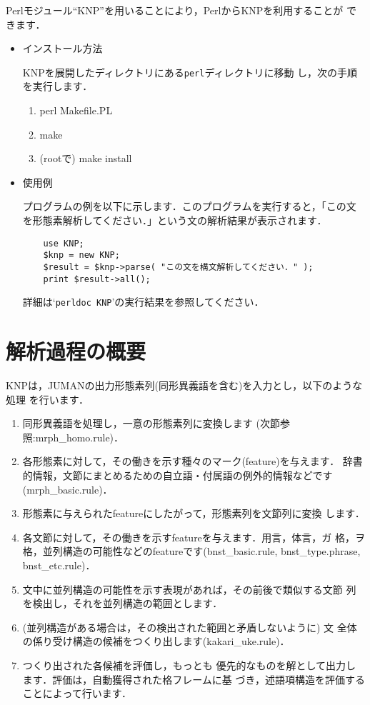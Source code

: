 \documentclass[a4j,11pt,titlepage]{jarticle}
\begin{document}
Perlモジュール``KNP''を用いることにより，PerlからKNPを利用することが
できます．

\begin{itemize}
 \item インストール方法

       KNPを展開したディレクトリにある\texttt{perl}ディレクトリに移動
       し，次の手順を実行します．
       \begin{enumerate}
	\item perl Makefile.PL
	\item make
	\item (rootで) make install
       \end{enumerate}
 \item 使用例

       プログラムの例を以下に示します．このプログラムを実行すると，「この文
       を形態素解析してください．」という文の解析結果が表示されます．

       \begin{verbatim}
	use KNP;
	$knp = new KNP;
	$result = $knp->parse( "この文を構文解析してください．" );
	print $result->all();
       \end{verbatim}

       詳細は`\texttt{perldoc KNP}'の実行結果を参照してください．
\end{itemize}


\section{解析過程の概要}

KNPは，JUMANの出力形態素列(同形異義語を含む)を入力とし，以下のような処理
を行います．

\begin{enumerate}
\item 同形異義語を処理し，一意の形態素列に変換します
  (次節参照:mrph\_homo.rule)．
\item 各形態素に対して，その働きを示す種々のマーク(feature)を与えます．
  辞書的情報，文節にまとめるための自立語・付属語の例外的情報などです
  (mrph\_basic.rule)．
\item 形態素に与えられたfeatureにしたがって，形態素列を文節列に変換
  します．
\item 各文節に対して，その働きを示すfeatureを与えます．用言，体言，ガ
  格，ヲ格，並列構造の可能性などのfeatureです(bnst\_basic.rule, 
  bnst\_type.phrase, bnst\_etc.rule)．
\item 文中に並列構造の可能性を示す表現があれば，その前後で類似する文節
  列を検出し，それを並列構造の範囲とします．
\item (並列構造がある場合は，その検出された範囲と矛盾しないように) 文
  全体の係り受け構造の候補をつくり出します(kakari\_uke.rule)．
\item つくり出された各候補を評価し，もっとも
  優先的なものを解として出力します．評価は，自動獲得された格フレームに基
  づき，述語項構造を評価することによって行います．
\end{enumerate}
\end{document}
